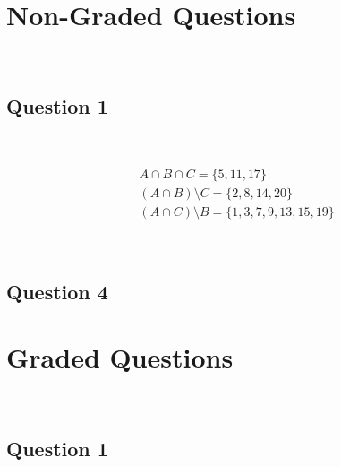\documentclass{article}
\begin{document}
\section*{Non-Graded Questions}

~

\subsection*{Question 1}

~

\begin{align*}
    &A\cap B\cap C=\{5,11,17\}\\
    &(A\cap B)\setminus C=\{2,8,14,20\}\\
    &(A\cap C)\setminus B=\{1,3,7,9,13,15,19\}
\end{align*}

~

\subsection*{Question 4}

\newpage

\section*{Graded Questions}

~

\subsection*{Question 1}

~
\end{document}
